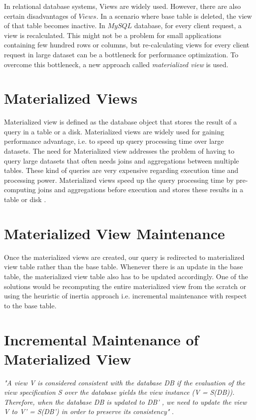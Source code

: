 \documentclass[11pt,a4paper,bibtotoc,idxtotoc,headsepline,footsepline,footexclude,BCOR12mm,DIV13]{scrbook}
\begin{document}
In relational database systems, Views are widely used. However, there are also certain disadvantages of $Views$. In a scenario where base table is deleted, the view of that table becomes inactive. In $MySQL$ database, for every client request, a view is recalculated. This might not be a problem for small applications containing few hundred rows or columns, but re-calculating views for every client request in large dataset can be a bottleneck for performance optimization. To overcome this bottleneck, a new approach called \emph{materialized view} is used.


\section{Materialized Views}

Materialized view is defined as the database object that stores the result of a query in a table or a disk. Materialized views are widely used for gaining performance advantage, i.e. to speed up query processing time over large datasets. The need for Materialized view addresses the problem of having to query large datasets that often needs joins and aggregations between multiple tables. These kind of queries are very expensive regarding execution time and processing power. Materialized views speed up the query processing time by pre-computing joins and aggregations before execution and stores these results in a table or disk \cite{materializedview:oracle}. 

\section{Materialized View Maintenance}
Once the materialized views are created, our query is redirected to materialized view table rather than the base table. Whenever there is an update in the base table, the materialized view table also has to be updated accordingly. One of the solutions would be recomputing the entire materialized view from the scratch or using the heuristic of inertia \cite{maintenance:materializedviews} approach i.e. incremental maintenance with respect to the base table.

\section{Incremental Maintenance of Materialized View}
\emph{"A view V is considered consistent with the database DB if the evaluation of the view specification S over the database yields the view instance (V = S(DB)). Therefore, when the database DB is updated to DB' , we need to update the view V to V' = S(DB') in order to preserve its consistency"} \cite{incrementalmaintenance:materializedviews}. 
\end{document}
